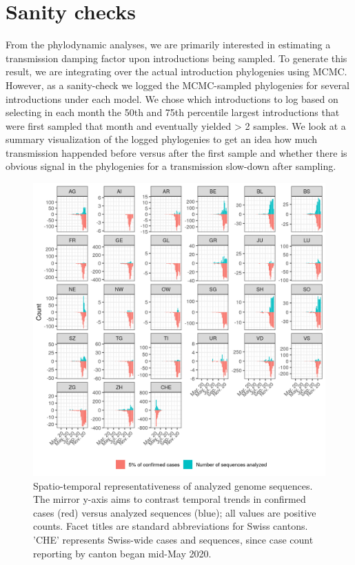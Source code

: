 \documentclass[9pt,twoside,lineno]{pnas-new}
\begin{document}
\section{Sanity checks}
From the phylodynamic analyses, we are primarily interested in estimating a transmission damping factor upon introductions being sampled. To generate this result, we are integrating over the actual introduction phylogenies using MCMC. However, as a sanity-check we logged the MCMC-sampled phylogenies for several introductions under each model. We chose which introductions to log based on selecting in each month the 50th and 75th percentile largest introductions that were first sampled that month and eventually yielded > 2 samples. We look at a summary visualization of the logged phylogenies to get an idea how much transmission happended before versus after the first sample and whether there is obvious signal in the phylogenies for a transmission slow-down after sampling.

\begin{figure}
\centering
\includegraphics[width = 11.4cm]{figures/CHE_downsampling.png}
\caption{Spatio-temporal representativeness of analyzed genome sequences. The mirror y-axis aims to contrast temporal trends in confirmed cases (red) versus analyzed sequences (blue); all values are positive counts. Facet titles are standard abbreviations for Swiss cantons. 'CHE' represents Swiss-wide cases and sequences, since case count reporting by canton began mid-May 2020.}  
\label{fig:downsampling_representativeness}
\end{figure}
\end{document}

